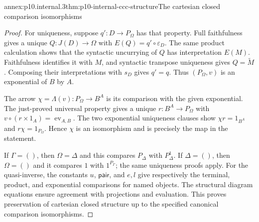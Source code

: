 \begin{annexitem}{annex:p10.internal.3}{thm:p10-internal-ccc-structure}{The cartesian closed comparison isomorphisms}
\begin{proof}
For uniqueness, suppose \(q':D\to P_\Omega\) has that property.
Full faithfulness gives a unique \(Q:J(D)\to\Omega\) with
\(E(Q)=q'\circ\varepsilon_D\).
The same product calculation shows that the syntactic uncurrying
of \(Q\) has interpretation \(E(M)\).  Faithfulness identifies it
with \(M\), and syntactic transpose uniqueness gives
\(Q=\widetilde M\).  Composing their interpretations with \(s_D\)
gives \(q'=q\).
Thus \((P_\Omega,v)\) is an exponential of \(B\) by \(A\).

The arrow \(\chi=\Lambda(v):P_\Omega\to B^A\) is its comparison
with the given exponential.  The just-proved universal property
gives a unique \(r:B^A\to P_\Omega\) with
\(v\circ(r\times1_A)=\operatorname{ev}_{A,B}\).
The two exponential uniqueness clauses show
\(\chi r=1_{B^A}\) and \(r\chi=1_{P_\Omega}\).
Hence \(\chi\) is an isomorphism and is precisely the map in the statement.

If \(\Gamma=()\), then \(\Omega=\Delta\) and this compares
\(P_\Delta\) with \(P_\Delta^1\).
If \(\Delta=()\), then \(\Omega=()\) and it compares \(1\) with
\(1^{P_\Gamma}\); the same uniqueness proofs apply.
For the quasi-inverse, the constants \(u\), \(\mathsf{pair}\), and
\(e,l\) give respectively the terminal, product, and exponential
comparisons for named objects.  The structural diagram equations
ensure agreement with projections and evaluation.
This proves preservation of cartesian closed structure up to the
specified canonical comparison isomorphisms.
\end{proof}
\end{annexitem}
